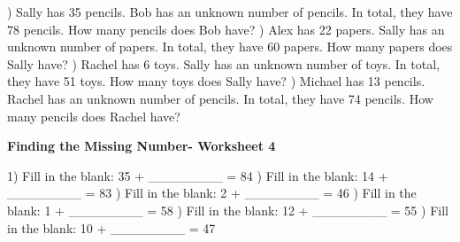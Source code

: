 \documentclass{article}%
\begin{document}
) Sally has 35 pencils. Bob has an unknown number of pencils. In total, they have 78 pencils. How many pencils does Bob have?%
\newline%
\newline%
) Alex has 22 papers. Sally has an unknown number of papers. In total, they have 60 papers. How many papers does Sally have?%
\newline%
\newline%
) Rachel has 6 toys. Sally has an unknown number of toys. In total, they have 51 toys. How many toys does Sally have?%
\newline%
\newline%
) Michael has 13 pencils. Rachel has an unknown number of pencils. In total, they have 74 pencils. How many pencils does Rachel have?%
\newline%
\newline%
\newline%
\pagebreak%
\large%
\begin{center}%
\textbf{Finding the Missing Number- Worksheet 4}%
\newline%
\newline%
\newline%
\end{center} \normalsize%
1) Fill in the blank: 35 + \_\_\_\_\_\_\_\_ = 84%
\newline%
\newline%
) Fill in the blank: 14 + \_\_\_\_\_\_\_\_ = 83%
\newline%
\newline%
) Fill in the blank: 2 + \_\_\_\_\_\_\_\_ = 46%
\newline%
\newline%
) Fill in the blank: 1 + \_\_\_\_\_\_\_\_ = 58%
\newline%
\newline%
) Fill in the blank: 12 + \_\_\_\_\_\_\_\_ = 55%
\newline%
\newline%
) Fill in the blank: 10 + \_\_\_\_\_\_\_\_ = 47%
\newline%
\end{document}
